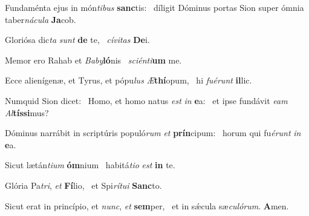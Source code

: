 \item Fundaménta ejus in món\textit{tibus} \textbf{sanc}tis:~\psstar{} díligit Dóminus portas Sion super ómnia taber\textit{nácula} \textbf{Ja}cob.
\item Gloriósa dic\textit{ta} \textit{sunt} \textbf{de} te,~\psstar{} \textit{cívitas} \textbf{De}i.
\item Memor ero Rahab et \textit{Baby}\textbf{ló}nis~\psstar{} \textit{sciénti}\textbf{um} me.
\item Ecce alienígenæ, et Tyrus, et pópu\textit{lus} \textit{Æ}\textbf{thí}opum,~\psstar{} hi \textit{fuérunt} \textbf{il}lic.
\item Numquid Sion dicet:~\pscross{} Homo, et homo natus \textit{est} \textit{in} \textbf{e}a:~\psstar{} et ipse fundávit \textit{eam} \textit{Al}\textbf{tís}\textbf{si}mus?
\item Dóminus narrábit in scriptúris populó\textit{rum} \textit{et} \textbf{prín}cipum:~\psstar{} horum qui fu\textit{érunt} \textit{in} \textbf{e}a.
\item Sicut lætán\textit{tium} \textbf{óm}nium~\psstar{} habitá\textit{tio} \textit{est} \textbf{in} te.
\item Glória Pa\textit{tri}, \textit{et} \textbf{Fí}lio,~\psstar{} et Spi\textit{rítui} \textbf{Sanc}to.
\item Sicut erat in princípio, et \textit{nunc}, \textit{et} \textbf{sem}per,~\psstar{} et in sǽcula sæ\textit{culórum}. \textbf{A}men.
